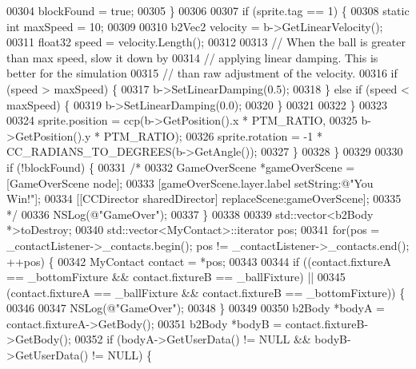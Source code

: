 \begin{DoxyCode}
{{{{{{00304                 blockFound = \textcolor{keyword}{true};
00305             \}
00306             
00307             \textcolor{keywordflow}{if} (sprite.tag == 1) \{
00308                 \textcolor{keyword}{static} \textcolor{keywordtype}{int} maxSpeed = 10;
00309                 
00310                 b2Vec2 velocity = b->GetLinearVelocity();
00311                 float32 speed = velocity.Length();
00312                 
00313                 \textcolor{comment}{// When the ball is greater than max speed, slow it down by}
00314                 \textcolor{comment}{// applying linear damping.  This is better for the simulation}
00315                 \textcolor{comment}{// than raw adjustment of the velocity.}
00316                 \textcolor{keywordflow}{if} (speed > maxSpeed) \{
00317                     b->SetLinearDamping(0.5);
00318                 \} \textcolor{keywordflow}{else} \textcolor{keywordflow}{if} (speed < maxSpeed) \{
00319                     b->SetLinearDamping(0.0);
00320                 \}
00321                 
00322             \}
00323             
00324             sprite.position = ccp(b->GetPosition().x * PTM\_RATIO,
00325                                     b->GetPosition().y * PTM\_RATIO);
00326             sprite.rotation = -1 * CC\_RADIANS\_TO\_DEGREES(b->GetAngle());
00327         \}        
00328     \}
00329     
00330     \textcolor{keywordflow}{if} (!blockFound) \{
00331         \textcolor{comment}{/*}
00332 \textcolor{comment}{        GameOverScene *gameOverScene = [GameOverScene node];}
00333 \textcolor{comment}{        [gameOverScene.layer.label setString:@"You Win!"];}
00334 \textcolor{comment}{        [[CCDirector sharedDirector] replaceScene:gameOverScene];}
00335 \textcolor{comment}{         */}
00336         NSLog(\textcolor{stringliteral}{@"GameOver"});
00337     \}
00338 
00339     std::vector<b2Body *>toDestroy;
00340     std::vector<MyContact>::iterator pos;
00341     \textcolor{keywordflow}{for}(pos = \_contactListener->\_contacts.begin(); pos != \_contactListener->\_contacts.end(); ++pos) \{
00342         MyContact contact = *pos;
00343         
00344         \textcolor{keywordflow}{if} ((contact.fixtureA == \_bottomFixture && contact.fixtureB == \_ballFixture) ||
00345             (contact.fixtureA == \_ballFixture && contact.fixtureB == \_bottomFixture)) \{
00346             
00347             NSLog(\textcolor{stringliteral}{@"GameOver"});
00348         \} 
00349                 
00350         b2Body *bodyA = contact.fixtureA->GetBody();
00351         b2Body *bodyB = contact.fixtureB->GetBody();
00352         \textcolor{keywordflow}{if} (bodyA->GetUserData() != NULL && bodyB->GetUserData() != NULL) \{
}}}}}}
\end{DoxyCode}
